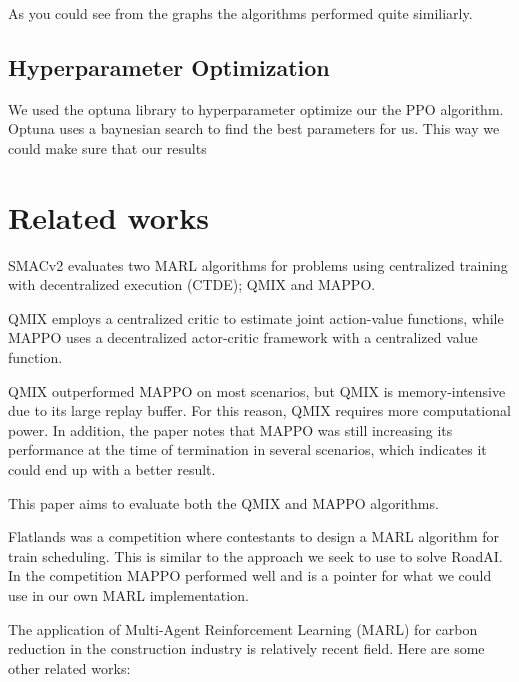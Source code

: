 \documentclass[conference]{IEEEtran}
\begin{document}
	As you could see from the graphs the algorithms performed quite similiarly.

	\subsection{Hyperparameter Optimization}
	We used the optuna library to hyperparameter optimize our the PPO algorithm. Optuna uses a baynesian search to find the best parameters for us. This way we could make sure that our results




	\section{Related works}
	SMACv2\cite{ellis2022smacv2} evaluates two MARL algorithms for problems using centralized training with
	decentralized execution (CTDE); QMIX and MAPPO.

	QMIX employs a centralized critic to estimate joint action-value functions, while MAPPO uses a decentralized
	actor-critic framework with a centralized value function.

	QMIX outperformed MAPPO on most scenarios, but QMIX is memory-intensive due to its large replay buffer. For
	this reason, QMIX requires more computational power. In addition, the paper notes that MAPPO was still
	increasing its performance at the time of termination in several scenarios, which indicates it could end up
	with a better result.

	This paper aims to evaluate both the QMIX and MAPPO algorithms.


	Flatlands\cite{laurent2021flatland} was a competition where contestants to design a MARL algorithm for
	train scheduling. This is similar to the approach we seek to use to solve RoadAI.
	In the competition MAPPO performed well and is a pointer for what we could use in our own MARL implementation.


	The application of Multi-Agent Reinforcement Learning (MARL) for carbon reduction in the construction industry is relatively recent field. Here are some other related works:
\end{document}

